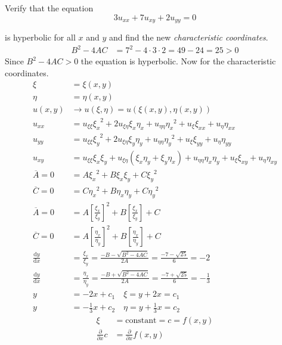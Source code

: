 \documentclass{article}
\begin{document}
Verify that the equation
\[3u_{xx}+7u_{xy}+2u_{yy}=0\]

is hyperbolic for all $x$ and $y$ and find the new \emph{characteristic coordinates}.
\begin{align*}
  B^2-4AC&=7^2-4\cdot3\cdot2=49-24=25>0
\end{align*}
Since $B^2-4AC>0$ the equation is hyperbolic. Now for the characteristic coordinates.
\begin{align*}
  \xi&=\xi(x,y)\\
  \eta&=\eta(x,y)\\
  u(x,y)&\to u(\xi,\eta)=u(\xi(x,y),\eta(x,y))\\
  u_{xx}&=u_{\xi\xi}{\xi_x}^2+2u_{\xi\eta}\xi_x\eta_x+u_{\eta\eta}{\eta_x}^2+u_\xi\xi_{xx}+u_\eta\eta_{xx}\\
  u_{yy}&=u_{\xi\xi}{\xi_y}^2+2u_{\xi\eta}\xi_y\eta_y+u_{\eta\eta}{\eta_y}^2+u_\xi\xi_{yy}+u_\eta\eta_{yy}\\
  u_{xy}&=u_{\xi\xi}\xi_x\xi_y+u_{\xi\eta}(\xi_x\eta_y+\xi_y\eta_x)+u_{\eta\eta}\eta_x\eta_y+u_\xi\xi_{xy}+u_\eta\eta_{xy}\\
  \overline{A}=0&=A{\xi_x}^2+B\xi_x\xi_y+C{\xi_y}^2\\
  \overline{C}=0&=C{\eta_x}^2+B\eta_x\eta_y+C{\eta_y}^2\\
  \overline{A}=0&=A\left[\frac{\xi_x}{\xi_y}\right]^2+B\left[\frac{\xi_x}{\xi_y}\right]+C\\
  \overline{C}=0&=A\left[\frac{\eta_x}{\eta_y}\right]^2+B\left[\frac{\eta_x}{\eta_y}\right]+C\\
  \frac{\mathrm{d}y}{\mathrm{d}x}&=\frac{\xi_x}{\xi_y}=\frac{-B-\sqrt{B^2-4AC}}{2A}=\frac{-7-\sqrt{25}}{6}=-2\\
  \frac{\mathrm{d}y}{\mathrm{d}x}&=\frac{\eta_x}{\eta_y}=\frac{-B+\sqrt{B^2-4AC}}{2A}=\frac{-7+\sqrt{25}}{6}=-\frac{1}{3}\\
  y&=-2x+c_1\quad\xi=y+2x=c_1\\
  y&=-\frac{1}{3}x+c_2\quad\eta=y+\frac{1}{3}x=c_2
\end{align*}
\begin{align*}
  \xi&=\text{constant}=c=f(x,y)\\
  \frac{\partial }{\partial x}c&=\frac{\partial }{\partial x}f(x,y)
\end{align*}
\end{document}
